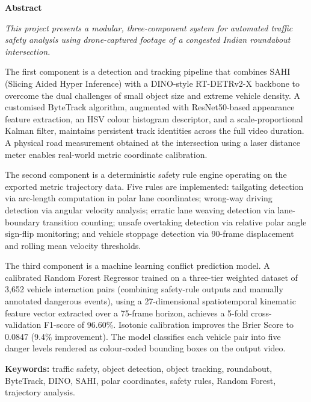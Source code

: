 \documentclass[12pt,a4paper]{report}
\begin{document}
\newpage\thispagestyle{empty}
\begin{center}{\bfseries Abstract}\end{center}
{\em\noindent
This project presents a modular, three-component system for automated traffic safety analysis
using drone-captured footage of a congested Indian roundabout intersection.

The first component is a detection and tracking pipeline that combines SAHI (Slicing Aided
Hyper Inference) with a DINO-style RT-DETRv2-X backbone to overcome the dual challenges of small
object size and extreme vehicle density.  A customised ByteTrack algorithm, augmented with
ResNet50-based appearance feature extraction, an HSV colour histogram descriptor, and a
scale-proportional Kalman filter, maintains persistent track identities across the full video
duration.  A physical road measurement obtained at the intersection using a laser distance meter
enables real-world metric coordinate calibration.

The second component is a deterministic safety rule engine operating on the exported metric
trajectory data.  Five rules are implemented: tailgating detection via arc-length computation
in polar lane coordinates; wrong-way driving detection via angular velocity analysis; erratic
lane weaving detection via lane-boundary transition counting; unsafe overtaking detection via
relative polar angle sign-flip monitoring; and vehicle stoppage detection via 90-frame
displacement and rolling mean velocity thresholds.

The third component is a machine learning conflict prediction model.  A calibrated Random
Forest Regressor trained on a three-tier weighted dataset of 3{,}652 vehicle interaction
pairs (combining safety-rule outputs and manually annotated dangerous events), using a
27-dimensional spatiotemporal kinematic feature vector extracted over a 75-frame horizon,
achieves a 5-fold cross-validation F1-score of 96.60\%.  Isotonic calibration improves the
Brier Score to 0.0847 (9.4\% improvement).  The model classifies each vehicle pair into five
danger levels rendered as colour-coded bounding boxes on the output video.

\medskip
\noindent\textbf{Keywords:} traffic safety, object detection, object tracking, roundabout,
ByteTrack, DINO, SAHI, polar coordinates, safety rules, Random Forest, trajectory analysis.
}

\clearpage\thispagestyle{empty}
\end{document}
